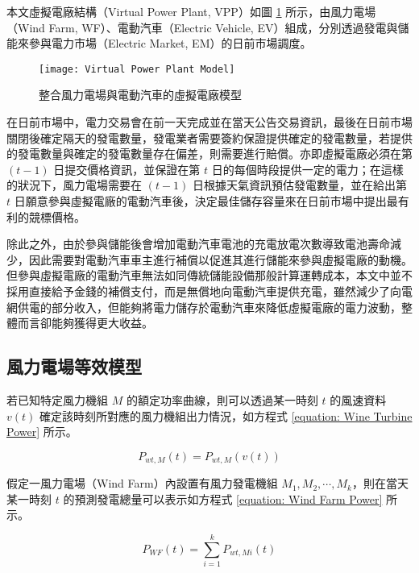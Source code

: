 本文虛擬電廠結構（Virtual Power Plant, VPP）如圖 \ref{figure: Virtual Power Plant Model} 所示，由風力電場（Wind Farm, WF）、電動汽車（Electric Vehicle, EV）組成，分別透過發電與儲能來參與電力市場（Electric Market, EM）的日前市場調度。

\begin{figure}[htbp]
  \centering
  \texttt{[image: Virtual Power Plant Model]}
  \caption{整合風力電場與電動汽車的虛擬電廠模型}
  \label{figure: Virtual Power Plant Model}
\end{figure}

在日前市場中，電力交易會在前一天完成並在當天公告交易資訊，最後在日前市場關閉後確定隔天的發電數量，發電業者需要簽約保證提供確定的發電數量，若提供的發電數量與確定的發電數量存在偏差，則需要進行賠償。亦即虛擬電廠必須在第 $(t - 1)$ 日提交價格資訊，並保證在第 $t$ 日的每個時段提供一定的電力；在這樣的狀況下，風力電場需要在 $(t - 1)$ 日根據天氣資訊預估發電數量，並在給出第 $t$ 日願意參與虛擬電廠的電動汽車後，決定最佳儲存容量來在日前市場中提出最有利的競標價格。

除此之外，由於參與儲能後會增加電動汽車電池的充電放電次數導致電池壽命減少，因此需要對電動汽車車主進行補償以促進其進行儲能來參與虛擬電廠的動機。但參與虛擬電廠的電動汽車無法如同傳統儲能設備那般計算運轉成本，本文中並不採用直接給予金錢的補償支付，而是無償地向電動汽車提供充電，雖然減少了向電網供電的部分收入，但能夠將電力儲存於電動汽車來降低虛擬電廠的電力波動，整體而言卻能夠獲得更大收益。

\subsection{風力電場等效模型}

若已知特定風力機組 $M$ 的額定功率曲線，則可以透過某一時刻 $t$ 的風速資料 $v(t)$ 確定該時刻所對應的風力機組出力情況，如方程式 \eqref{equation: Wine Turbine Power} 所示。

\begin{equation}\label{equation: Wine Turbine Power}
  P_{wt, M} (t) = P_{wt, M} (v (t))
\end{equation}

假定一風力電場（Wind Farm）內設置有風力發電機組 $M_{1}, M_{2}, \cdots, M_{k}$，則在當天某一時刻 $t$ 的預測發電總量可以表示如方程式 \eqref{equation: Wind Farm Power} 所示。

\begin{equation}\label{equation: Wind Farm Power}
  P_{WF}(t) = \sum_{i = 1}^{k} P_{wt, Mi} (t)
\end{equation}

